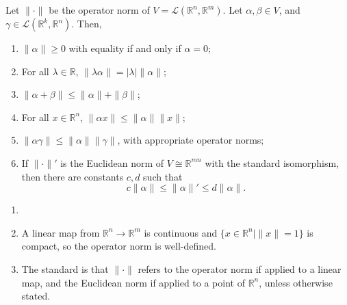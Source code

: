\documentclass[12pt]{article}
\begin{document}
\begin{proposition}
	Let $\|\cdot\|$ be the operator norm of $V = \mathcal{L}(\mathbb{R}^{n}, \mathbb{R}^{m})$. Let $\alpha, \beta \in V$, and $\gamma \in \mathcal{L}(\mathbb{R}^{k}, \mathbb{R}^{n})$. Then,
	\begin{enumerate}[\normalfont(i)]
		\item $\|\alpha\| \geq 0$ with equality if and only if $\alpha = 0$;
		\item For all $\lambda \in \mathbb{R}$, $\|\lambda \alpha \| = |\lambda| \|\alpha\|$;
		\item $\|\alpha + \beta\| \leq \|\alpha\| + \|\beta\|$;
		\item For all $x \in \mathbb{R}^{n}$, $\|\alpha x\| \leq \|\alpha\| \|x\|$;
		\item $\|\alpha \gamma \| \leq \|\alpha\|\|\gamma\|$, with appropriate operator norms;
		\item If $\|\cdot\|'$ is the Euclidean norm of $V \cong \mathbb{R}^{mn}$ with the standard isomorphism, then there are constants $c, d$ such that
			\[
			c\|\alpha\| \leq \|\alpha\|' \leq d\|\alpha\|
			.\]
	\end{enumerate}
\end{proposition}

\begin{remark}
	\begin{enumerate}[1.]
		\item[]
		\item A linear map from $\mathbb{R}^{n} \to \mathbb{R}^{m}$ is continuous and $\{x \in \mathbb{R}^{n} \mid \|x\| = 1\}$ is compact, so the operator norm is well-defined.
		\item The standard is that $\|\cdot\|$ refers to the operator norm if applied to a linear map, and the Euclidean norm if applied to a point of $\mathbb{R}^{n}$, unless otherwise stated.
	\end{enumerate}	
\end{remark}
\end{document}
